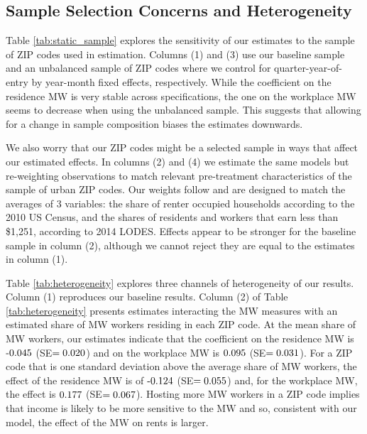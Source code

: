 \subsection{Sample Selection Concerns and Heterogeneity}
\label{sec:results_heterogeneity}

Table \ref{tab:static_sample} explores the sensitivity of our estimates to 
the sample of ZIP codes used in estimation.
Columns (1) and (3) use our baseline sample and
an unbalanced sample of ZIP codes where we control for quarter-year-of-entry by
year-month fixed effects, respectively.
While the coefficient on the residence MW is very stable across specifications,
the one on the workplace MW seems to decrease when using the unbalanced
sample.
This suggests that allowing for a change in sample composition biases the 
estimates downwards.

We also worry that our ZIP codes might be a selected sample in ways that affect
our estimated effects.
In columns (2) and (4) we estimate the same models but re-weighting 
observations to match relevant pre-treatment characteristics of the sample of 
urban ZIP codes.
Our weights follow \textcite{Hainmueller2012} and are designed to match the 
averages of 3 variables: 
the share of renter occupied households according to the 2010 US Census, and
the shares of residents and workers that earn less than \$1,251, according to
2014 LODES.
Effects appear to be stronger for the baseline sample in column (2), although
we cannot reject they are equal to the estimates in column (1).

Table \ref{tab:heterogeneity} explores three channels of heterogeneity of our 
results.
Column (1) reproduces our baseline results.
Column (2) of Table \ref{tab:heterogeneity} presents estimates interacting
the MW measures with an estimated share of MW workers residing in each ZIP code.
At the mean share of MW workers, our estimates indicate that the coefficient on 
the residence MW is $\textnormal{-0.045}$ (SE$=\textnormal{0.020}$) and 
on the workplace MW is $\textnormal{0.095}$ (SE$=\textnormal{0.031}$).
For a ZIP code that is one standard deviation above the average share of MW 
workers, the effect of the residence MW is of $\textnormal{-0.124}$ 
(SE$=\textnormal{0.055}$) and, for the workplace MW, the effect is
$\textnormal{0.177}$ (SE$=\textnormal{0.067}$).
Hosting more MW workers in a ZIP code implies that income is likely to be more 
sensitive to the MW and so, consistent with our model, the effect of the MW
on rents is larger.

